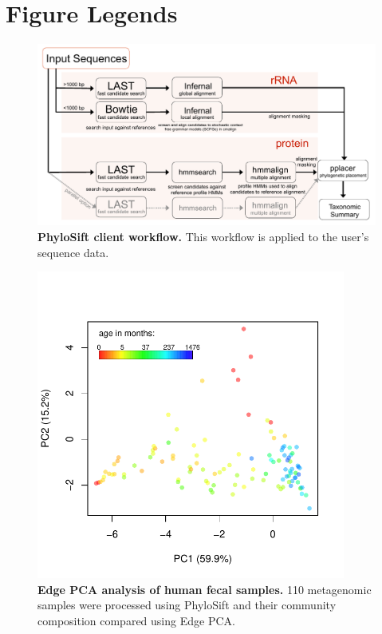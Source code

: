 \documentclass[10pt]{article}
\begin{document}
\clearpage

\section*{Figure Legends}
\begin{figure}[hp]
\begin{center}
\includegraphics[width=6.5in]{figures/Phylosift_overview_vector.pdf}
\end{center}
\caption{\textbf{PhyloSift client workflow.} This workflow is applied to the user's sequence data.}
\label{fig:overview}
\end{figure}

\begin{figure}[hp]
\begin{center}
\includegraphics[width=4in]{figures/age_pca.pdf}
\end{center}
\caption{\textbf{Edge PCA analysis of human fecal samples.} 110 metagenomic samples were processed using PhyloSift and their community composition compared using Edge PCA.}
\label{fig:agepca}
\end{figure}
\end{document}
